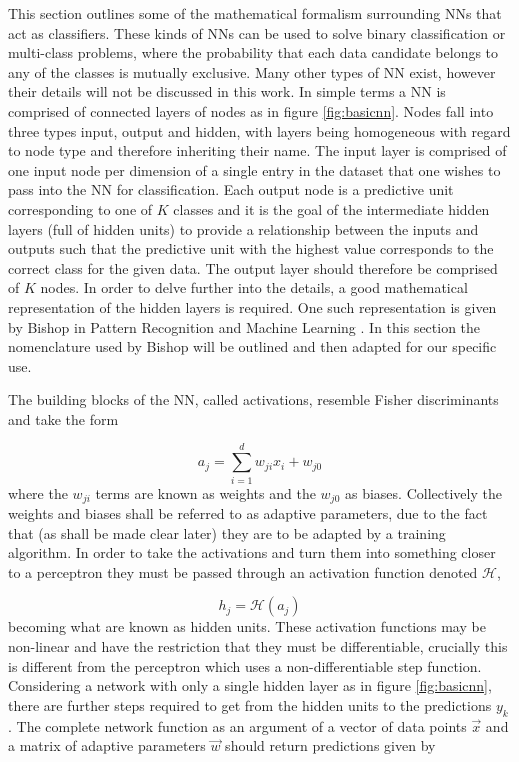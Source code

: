 This section outlines some of the mathematical formalism surrounding NNs
that act as classifiers. These kinds of NNs can be used to solve binary
classification or multi-class problems, where the probability that each data
candidate belongs to any of the classes is mutually exclusive. Many other types
of NN exist, however their details will not be discussed in this work. In simple
terms a NN is comprised of connected layers of nodes as in figure
\ref{fig:basicnn}. Nodes fall into three types input, output and hidden, with
layers being homogeneous with regard to node type and therefore inheriting their
name. The input layer is comprised of one input node per dimension of a single
entry in the dataset that one wishes to pass into the NN for classification.
Each output node is a predictive unit corresponding to one of $K$ classes and it
is the goal of the intermediate hidden layers (full of hidden units) to provide
a relationship between the inputs and outputs such that the predictive unit with
the highest value corresponds to the correct class for the given data. The
output layer should therefore be comprised of $K$ nodes. In order to delve
further into the details, a good mathematical representation of the hidden
layers is required. One such representation is given by Bishop in Pattern
Recognition and Machine Learning \cite{PRML}. In this section the nomenclature
used by Bishop will be outlined and then adapted for our specific use.


The building blocks of the NN, called activations, resemble Fisher
discriminants \cite{Fisher} and take the form

\begin{equation}
a_j = \sum_{i=1}^{d} w_{ji}x_{i} + w_{j0}
\label{eq:fisher}
\end{equation}
where the $w_{ji}$ terms are known as weights and the $w_{j0}$ as biases.
Collectively the weights and biases shall be referred to as adaptive parameters,
due to the fact that (as shall be made clear later) they are to be adapted by a
training algorithm. In order to take the activations and turn them into
something closer to a perceptron \cite{Rosenblatt} they must be passed through
an activation function denoted $\mathcal{H}$,

\begin{equation}
h_j = \mathcal{H}(a_j)
\label{eq:hiddenunit}
\end{equation}
becoming what are known as hidden units. These activation functions may be
non-linear and have the restriction that they must be differentiable, crucially
this is different from the perceptron which uses a non-differentiable step
function. Considering a network with only a single hidden layer as in figure
\ref{fig:basicnn}, there are further steps required to get from the hidden units
to the predictions $y_k$. The complete network function as an argument of a
vector of data points $\vec{x}$ and a matrix of adaptive parameters
$\vec{w}$ should return predictions given by

